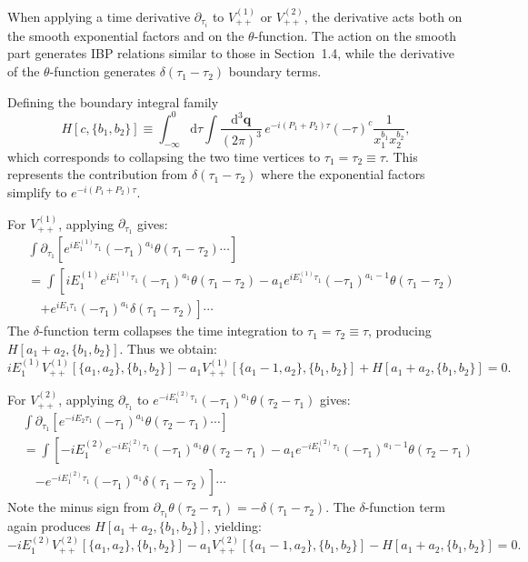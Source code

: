 \documentclass[a4paper,12pt]{article}
\def\di{{\mathrm{d}}}
\begin{document}
When applying a time derivative $\partial_{\tau_i}$ to $V_{++}^{(1)}$ or $V_{++}^{(2)}$, the derivative acts both on the smooth exponential factors and on the $\theta$-function. The action on the smooth part generates IBP relations similar to those in Section~1.4, while the derivative of the $\theta$-function generates $\delta(\tau_1-\tau_2)$ boundary terms.

Defining the boundary integral family
\begin{equation}
	H[c, \{b_1,b_2\}] \equiv \int_{-\infty}^0 \di\tau \int \frac{\di^3\bm q}{(2\pi)^3} \,
	e^{-i(P_1+P_2)\tau} (-\tau)^{c}
	\frac{1}{x_1^{b_1}x_2^{b_2}},
\end{equation}
which corresponds to collapsing the two time vertices to $\tau_1=\tau_2\equiv\tau$. This represents the contribution from $\delta(\tau_1-\tau_2)$ where the exponential factors simplify to $e^{-i(P_1+P_2)\tau}$.

For $V_{++}^{(1)}$, applying $\partial_{\tau_1}$ gives:
\begin{align}
	 & \int \partial_{\tau_1} \left[ e^{iE_1^{(1)}\tau_1}(-\tau_1)^{a_1} \theta(\tau_1-\tau_2) \cdots \right] \nonumber                                                       \\
	 & = \int \left[ iE_1^{(1)} e^{iE_1^{(1)}\tau_1}(-\tau_1)^{a_1} \theta(\tau_1-\tau_2) - a_1 e^{iE_1^{(1)}\tau_1}(-\tau_1)^{a_1-1} \theta(\tau_1-\tau_2) \right. \nonumber \\
	 & \quad \left. + e^{iE_1\tau_1}(-\tau_1)^{a_1} \delta(\tau_1-\tau_2) \right] \cdots
\end{align}
The $\delta$-function term collapses the time integration to $\tau_1=\tau_2\equiv\tau$, producing $H[a_1+a_2, \{b_1,b_2\}]$. Thus we obtain:
\begin{equation}
	iE_1^{(1)} V_{++}^{(1)}[\{a_1,a_2\},\{b_1,b_2\}] - a_1 V_{++}^{(1)}[\{a_1-1,a_2\},\{b_1,b_2\}] + H[a_1+a_2, \{b_1,b_2\}] = 0. \label{eq:Vpp1timeIBP}
\end{equation}

For $V_{++}^{(2)}$, applying $\partial_{\tau_1}$ to $e^{-iE_1^{(2)}\tau_1}(-\tau_1)^{a_1}\theta(\tau_2-\tau_1)$ gives:
\begin{align}
	 & \int \partial_{\tau_1} \left[ e^{-iE_2\tau_1}(-\tau_1)^{a_1} \theta(\tau_2-\tau_1) \cdots \right] \nonumber                                                               \\
	 & = \int \left[ -iE_1^{(2)} e^{-iE_1^{(2)}\tau_1}(-\tau_1)^{a_1} \theta(\tau_2-\tau_1) - a_1 e^{-iE_1^{(2)}\tau_1}(-\tau_1)^{a_1-1} \theta(\tau_2-\tau_1) \right. \nonumber \\
	 & \quad \left. - e^{-iE_1^{(2)}\tau_1}(-\tau_1)^{a_1} \delta(\tau_1-\tau_2) \right] \cdots
\end{align}
Note the minus sign from $\partial_{\tau_1}\theta(\tau_2-\tau_1) = -\delta(\tau_1-\tau_2)$. The $\delta$-function term again produces $H[a_1+a_2, \{b_1,b_2\}]$, yielding:
\begin{equation}
	-iE_1^{(2)} V_{++}^{(2)}[\{a_1,a_2\},\{b_1,b_2\}] - a_1 V_{++}^{(2)}[\{a_1-1,a_2\},\{b_1,b_2\}] - H[a_1+a_2, \{b_1,b_2\}] = 0. \label{eq:Vpp2timeIBP}
\end{equation}
\end{document}
